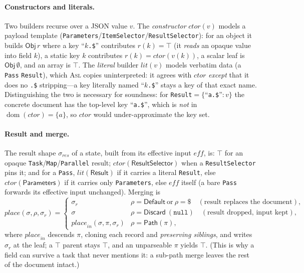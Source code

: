 \documentclass[11pt]{article}
\newcommand{\asl}{\textsc{Asl}}
\newcommand{\dom}{\operatorname{dom}}
\newcommand{\Obj}{\mathsf{Obj}}
\newcommand{\place}{\mathit{place}}
\newcommand{\eff}{\mathit{eff}}
\theoremstyle{plain}
\theoremstyle{definition}
\theoremstyle{remark}
\begin{document}
\paragraph{Constructors and literals.}
Two builders recurse over a JSON value $v$. The \emph{constructor} $\mathit{ctor}(v)$ models a
payload template (\texttt{Parameters}/\texttt{ItemSelector}/\texttt{ResultSelector}): for an
object it builds $\Obj\,r$ where a key ``$k$\texttt{.\$}'' contributes $r(k)=\top$ (it
\emph{reads} an opaque value into field $k$), a static key $k$ contributes
$r(k)=\mathit{ctor}(v(k))$, a scalar leaf is $\Obj\,\emptyset$, and an array is $\top$. The
\emph{literal} builder $\mathit{lit}(v)$ models verbatim data (a \texttt{Pass} \texttt{Result}),
which \asl{} copies uninterpreted: it agrees with $\mathit{ctor}$ \emph{except} that it does no
\texttt{.\$} stripping---a key literally named ``$k$\texttt{.\$}'' stays a key of that exact
name. Distinguishing the two is necessary for soundness: for
\texttt{Result}$=\{$``\texttt{a.\$}''$:v\}$ the concrete document has the top-level key
``\texttt{a.\$}'', which is \emph{not} in $\dom(\mathit{ctor})=\{a\}$, so $\mathit{ctor}$ would
under-approximate the key set.

\paragraph{Result and merge.}
The result shape $\sigma_{\mathit{res}}$ of a state, built from its effective input $\eff$, is:
$\top$ for an opaque \texttt{Task}/\texttt{Map}/\texttt{Parallel} result;
$\mathit{ctor}(\textsf{ResultSelector})$ when a \texttt{ResultSelector} pins it; and for a
\texttt{Pass}, $\mathit{lit}(\textsf{Result})$ if it carries a literal \texttt{Result}, else
$\mathit{ctor}(\textsf{Parameters})$ if it carries only \texttt{Parameters}, else $\eff$ itself
(a bare \texttt{Pass} forwards its effective input unchanged). Merging is
\[
  \place(\sigma,\rho,\sigma_r)=
  \begin{cases}
    \sigma_r & \rho=\textsf{Default}\ \text{or}\ \rho=\$ \quad(\text{result replaces the document}),\\
    \sigma & \rho=\textsf{Discard}\ (\texttt{null})\quad(\text{result dropped, input kept}),\\
    \place_{\mathit{in}}(\sigma,\pi,\sigma_r) & \rho=\textsf{Path}(\pi),
  \end{cases}
\]
where $\place_{\mathit{in}}$ descends $\pi$, cloning each record and \emph{preserving
siblings}, and writes $\sigma_r$ at the leaf; a $\top$ parent stays $\top$, and an
unparseable $\pi$ yields $\top$. (This is why a field can survive a task that never mentions
it: a sub-path merge leaves the rest of the document intact.)
\end{document}
